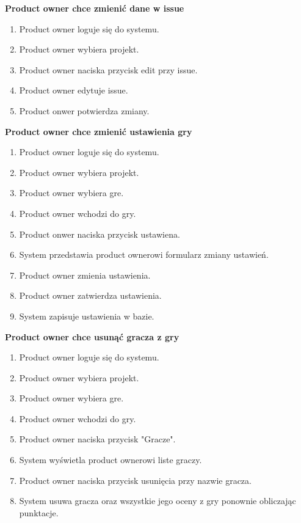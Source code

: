\textbf{Product owner chce zmienić dane w issue}

\begin{enumerate}
    \item Product owner loguje się do systemu.
    \item Product owner wybiera projekt.
    \item Product owner naciska przycisk edit przy issue.
    \item Product owner edytuje issue.
    \item Product onwer potwierdza zmiany.
\end{enumerate}

\textbf{Product owner chce zmienić ustawienia gry}

\begin{enumerate}
    \item Product owner loguje się do systemu.
    \item Product owner wybiera projekt.
    \item Product owner wybiera gre.
    \item Product owner wchodzi do gry.
    \item Product onwer naciska przycisk ustawiena.
    \item System przedstawia product ownerowi formularz zmiany ustawień.
    \item Product owner zmienia ustawienia.
    \item Product owner zatwierdza ustawienia.
    \item System zapisuje ustawienia w bazie.
\end{enumerate}

\textbf{Product owner chce usunąć gracza z gry}

\begin{enumerate}
    \item Product owner loguje się do systemu.
    \item Product owner wybiera projekt.
    \item Product owner wybiera gre.
    \item Product owner wchodzi do gry.
    \item Product owner naciska przycisk "Gracze".
    \item System wyświetla product ownerowi liste graczy.
    \item Product owner naciska przycisk usunięcia przy nazwie gracza.
    \item System usuwa gracza oraz wszystkie jego oceny z gry ponownie obliczając punktacje.
\end{enumerate}

